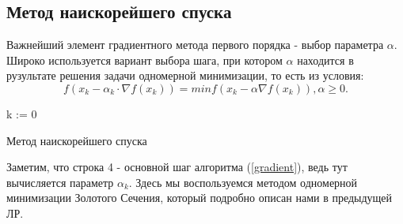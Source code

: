 \documentclass[../body.tex]{subfiles}
\begin{document}
\subsection{Метод наискорейшего спуска}
Важнейший элемент градиентного метода первого порядка - выбор параметра $\alpha$. Широко используется вариант выбора шага, при котором $\alpha$ находится в рузультате решения задачи одномерной минимизации, то есть из условия: $$f(x_k - \alpha_k \cdot \nabla f(x_k)) = min f(x_k - \alpha \nabla f(x_k)), \alpha \geq 0.$$

\begin{algorithm}[H]\label{gradient}
	k := 0\;
	\caption{Метод наискорейшего спуска}
\end{algorithm}

Заметим, что строка 4 - основной шаг алгоритма (\ref{gradient}), ведь тут вычисляется параметр $\alpha_k$. Здесь мы воспользуемся методом одномерной минимизации Золотого Сечения, который подробно описан нами в предыдущей ЛР.
\end{document}
